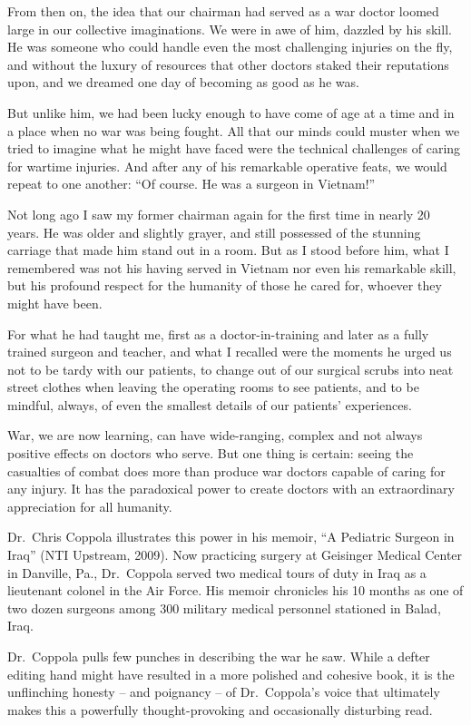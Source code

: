 ﻿\documentclass[12pt]{article}
\begin{document}
From then on, the idea that our chairman had served as a war doctor loomed large in our collective
imaginations. We were in awe of him, dazzled by his skill. He was someone who could handle even the
most challenging injuries on the fly, and without the luxury of resources that other doctors staked
their reputations upon, and we dreamed one day of becoming as good as he was.

But unlike him, we had been lucky enough to have come of age at a time and in a place when no war
was being fought. All that our minds could muster when we tried to imagine what he might have faced
were the technical challenges of caring for wartime injuries. And after any of his remarkable
operative feats, we would repeat to one another: ``Of course. He was a surgeon in Vietnam!''

Not long ago I saw my former chairman again for the first time in nearly 20 years. He was older and
slightly grayer, and still possessed of the stunning carriage that made him stand out in a room. But
as I stood before him, what I remembered was not his having served in Vietnam nor even his
remarkable skill, but his profound respect for the humanity of those he cared for, whoever they
might have been.

For what he had taught me, first as a doctor-in-training and later as a fully trained surgeon and
teacher, and what I recalled were the moments he urged us not to be tardy with our patients, to
change out of our surgical scrubs into neat street clothes when leaving the operating rooms to see
patients, and to be mindful, always, of even the smallest details of our patients' experiences.

War, we are now learning, can have wide-ranging, complex and not always positive effects on doctors
who serve. But one thing is certain: seeing the casualties of combat does more than produce war
doctors capable of caring for any injury. It has the paradoxical power to create doctors with an
extraordinary appreciation for all humanity.

Dr.~Chris Coppola illustrates this power in his memoir, ``A Pediatric Surgeon in Iraq'' (NTI
Upstream, 2009). Now practicing surgery at Geisinger Medical Center in Danville, Pa., Dr.~Coppola
served two medical tours of duty in Iraq as a lieutenant colonel in the Air Force. His memoir
chronicles his 10 months as one of two dozen surgeons among 300 military medical personnel stationed
in Balad, Iraq.

Dr.~Coppola pulls few punches in describing the war he saw. While a defter editing hand might have
resulted in a more polished and cohesive book, it is the unflinching honesty -- and poignancy -- of
Dr.~Coppola's voice that ultimately makes this a powerfully thought-provoking and occasionally
disturbing read.
\end{document}
